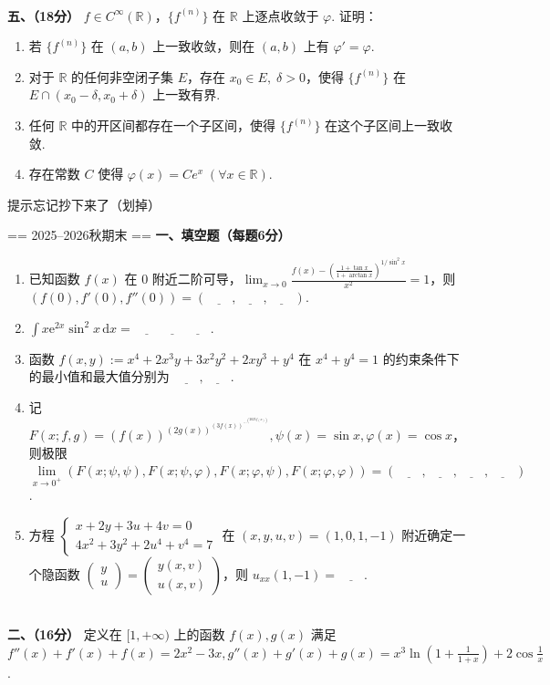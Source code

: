 \\

\textbf{五、（18分）}
$f\in C^\infty(\mathbb R)$，$\{f^{(n)}\}$ 在 $\mathbb R$ 上逐点收敛于 $\varphi$. 证明：
\begin{enumerate}
    \item 若 $\{f^{(n)}\}$ 在 $(a,b)$ 上一致收敛，则在 $(a,b)$ 上有 $\varphi'=\varphi$.
    \item 对于 $\mathbb R$ 的任何非空闭子集 $E$，存在 $x_0\in E,\;\delta>0$，使得 $\{f^{(n)}\}$ 在 $E\cap(x_0-\delta,x_0+\delta)$ 上一致有界.
    \item 任何 $\mathbb R$ 中的开区间都存在一个子区间，使得 $\{f^{(n)}\}$ 在这个子区间上一致收敛.
    \item 存在常数 $C$ 使得 $\varphi(x)=Ce^x\;(\forall x\in\mathbb R)$.
\end{enumerate}
提示忘记抄下来了（划掉）

== 2025--2026秋期末 ==
\textbf{一、填空题（每题6分）}

\begin{enumerate}
    \item 已知函数 $f(x)$ 在 $0$ 附近二阶可导，$\displaystyle\lim_{x\to0}\frac{f(x)-\left(\frac{1+\tan x}{1+\arctan x}\right)^{1/\sin^2x}}{x^2}=1$，则 $\left(f(0),f'(0),f''(0)\right)=(\underline{\qquad},\underline{\qquad},\underline{\qquad})$.
    \item $\displaystyle\int x\mathrm e^{2x}\sin^2x\,\mathrm dx=\underline{\qquad}\underline{\qquad}\underline{\qquad}$.
    \item 函数 $f(x,y):=x^4+2x^3y+3x^2y^2+2xy^3+y^4$ 在 $x^4+y^4=1$ 的约束条件下的最小值和最大值分别为 $\underline{\qquad},\underline{\qquad}$.
    \item 记 $F(x;f,g)=(f(x))^{(2g(x))^{(3f(x))^{\cdots^{(2025f(x))}}}},\psi(x)=\sin x,\varphi(x)=\cos x$，则极限 $\lim\limits_{x\to0^+}(F(x;\psi,\psi),F(x;\psi,\varphi),F(x;\varphi,\psi),F(x;\varphi,\varphi))=(\underline{\qquad},\underline{\qquad},\underline{\qquad},\underline{\qquad})$.
    \item 方程 $\begin{cases}
        x+2y+3u+4v=0\\
        4x^2+3y^2+2u^4+v^4=7
    \end{cases}$ 在 $(x,y,u,v)=(1,0,1,-1)$ 附近确定一个隐函数 $\begin{pmatrix}y\\u\end{pmatrix}=\begin{pmatrix}y(x,v)\\u(x,v)\end{pmatrix}$，则 $u_{xx}(1,-1)=\underline{\qquad}$.
\end{enumerate} 
\\
\textbf{二、（16分）}
定义在 $[1,+\infty)$ 上的函数 $f(x),g(x)$ 满足 $f''(x)+f'(x)+f(x)=2x^2-3x,g''(x)+g'(x)+g(x)=x^3\ln\left(1+\frac1{1+x}\right)+2\cos\frac1x$.

